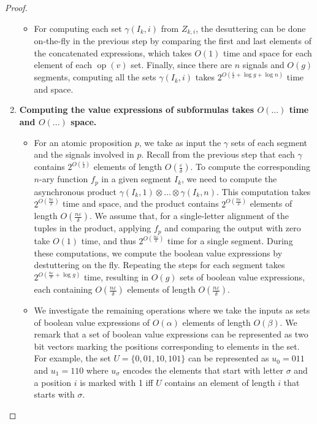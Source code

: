 \begin{proof}
\begin{enumerate}
\begin{itemize}
			\item
			For computing each set $\gamma(I_k, i)$ from $Z_{k,i}$, the desuttering can be done on-the-fly in the previous step by comparing the first and last elements of the concatenated expressions, which takes $O(1)$ time and space for each element of each $\operatorname{op}(v)$ set.
			Finally, since there are $n$ signals and $O(g)$ segments, computing all the sets $\gamma(I_k, i)$ takes $2^{O(\frac{\varepsilon}{\delta} + \log g + \log n)}$ time and space.
		\end{itemize}

		\item
		\textbf{Computing the value expressions of subformulas takes $O(...)$ time and $O(...)$ space.}
		\begin{itemize}
			\item
			For an atomic proposition $p$, we take as input the $\gamma$ sets of each segment and the signals involved in $p$.
			Recall from the previous step that each $\gamma$ contains $2^{O(\frac{\varepsilon}{\delta})}$ elements of length $O(\frac{\varepsilon}{\delta})$.
			To compute the corresponding $n$-ary function $f_p$ in a given segment $I_k$, we need to compute the asynchronous product $\gamma(I_k, 1) \otimes \ldots \otimes \gamma(I_k, n)$.
			This computation takes $2^{O(\frac{n\varepsilon}{\delta})}$ time and space, and the product contains $2^{O(\frac{n\varepsilon}{\delta})}$ elements of length $O(\frac{n\varepsilon}{\delta})$.
			We assume that, for a single-letter alignment of the tuples in the product, applying $f_p$ and comparing the output with zero take $O(1)$ time, and thus $2^{O(\frac{n\varepsilon}{\delta})}$ time for a single segment.
			During these computations, we compute the boolean value expressions by destuttering on the fly.
			Repeating the steps for each segment takes $2^{O(\frac{n\varepsilon}{\delta} + \log g)}$ time, resulting in $O(g)$ sets of boolean value expressions, each containing $O(\frac{n\varepsilon}{\delta})$ elements of length $O(\frac{n\varepsilon}{\delta})$.
			
			\item 
			We investigate the remaining operations where we take the inputs as sets of boolean value expressions of $O(\alpha)$ elements of length $O(\beta)$.
			We remark that a set of boolean value expressions can be represented as two bit vectors marking the positions corresponding to elements in the set.
			For example, the set $U = \{0, 01, 10, 101\}$ can be represented as $u_0 = 011$ and $u_1 = 110$ where $u_\sigma$ encodes the elements that start with letter $\sigma$ and a position $i$ is marked with 1 iff $U$ contains an element of length $i$ that starts with $\sigma$.
			

\end{itemize}
\end{enumerate}
\end{proof}

